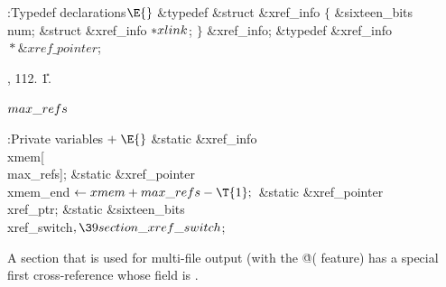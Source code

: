 \Y\B\4:Typedef declarations\X${}\E{}$\6
\&{typedef} \&{struct} \&{xref\_info} ${}\{{}$\1\6
\&{sixteen\_bits} \\{num};\6
\&{struct} \&{xref\_info} ${}{*}\\{xlink}{}$;\2\6
${}\}{}$ \&{xref\_info};\6
\&{typedef} \&{xref\_info} ${}{*}\&{xref\_pointer}{}$;\par
{}, 112.
\U1.\fi

\B\D$\\{max\_refs}$ \5
\par
\Y\B\4:Private variables\X${}\mathrel+\E{}$\6
\&{static} \&{xref\_info} \\{xmem}[\\{max\_refs}];\6
\&{static} \&{xref\_pointer} \\{xmem\_end}${}\K\\{xmem}+\\{max\_refs}-\T{1};{}$%
\6
\&{static} \&{xref\_pointer} \\{xref\_ptr};\6
\&{static} \&{sixteen\_bits} \\{xref\_switch}${},\39\\{section\_xref%
\_switch}{}$;\par
\fi

A section that is used for multi-file output (with the \.{@(} feature)
has a special first cross-reference whose  field is .

